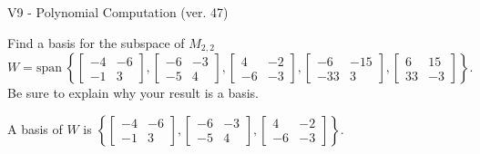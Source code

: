 \begin{exercise}
  \begin{exerciseTitle}V9 - Polynomial Computation (ver. 47)\end{exerciseTitle}
  \begin{exerciseStatement}
    Find a basis for the subspace of \(M_{2,2}\) 
\[W=\mathrm{span}\ \left\{\left[\begin{array}{cc}
-4 & -6 \\
-1 & 3
\end{array}\right] , \left[\begin{array}{cc}
-6 & -3 \\
-5 & 4
\end{array}\right] , \left[\begin{array}{cc}
4 & -2 \\
-6 & -3
\end{array}\right] , \left[\begin{array}{cc}
-6 & -15 \\
-33 & 3
\end{array}\right] , \left[\begin{array}{cc}
6 & 15 \\
33 & -3
\end{array}\right]\right\}.\]
 Be sure to explain why your result is a basis.


  \end{exerciseStatement}
  \begin{exerciseAnswer}
   A basis of \(W\) is  \(\left\{\left[\begin{array}{cc}
-4 & -6 \\
-1 & 3
\end{array}\right] , \left[\begin{array}{cc}
-6 & -3 \\
-5 & 4
\end{array}\right] , \left[\begin{array}{cc}
4 & -2 \\
-6 & -3
\end{array}\right]\right\}\).
  


  \end{exerciseAnswer}
\end{exercise}